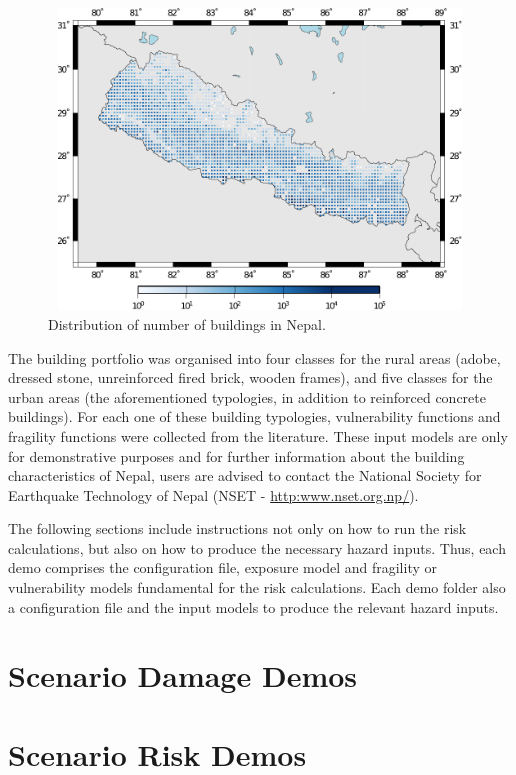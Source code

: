 \begin{figure}[ht]
\centering
\includegraphics[width=12cm,height=8cm]{figures/risk/exposure-nepal.pdf}
\caption{Distribution of number of buildings in Nepal.}
\label{fig:exposure-nepal}
\end{figure}

The building portfolio was organised into four classes for the rural areas
(adobe, dressed stone, unreinforced fired brick, wooden frames), and five
classes for the urban areas (the aforementioned typologies, in addition to
reinforced concrete buildings). For each one of these building typologies,
\glspl{vulnerability function} and \glspl{fragility function} were collected
from the literature. These input models are only for demonstrative purposes
and for further information about the building characteristics of Nepal, users
are advised to contact the National Society for Earthquake Technology of Nepal
(NSET - \href{http://www.nset.org.np/}{http:www.nset.org.np/}).

The following sections include instructions not only on how to run the risk
calculations, but also on how to produce the necessary hazard inputs. Thus,
each demo comprises the configuration file, exposure model and fragility or
vulnerability models fundamental for the risk calculations. Each demo folder
also a configuration file and the input models to produce the relevant hazard
inputs.


\section{Scenario Damage Demos}
\label{sec:demos_scenario_damage}


\section{Scenario Risk Demos}
\label{sec:demos_scenario_risk}


